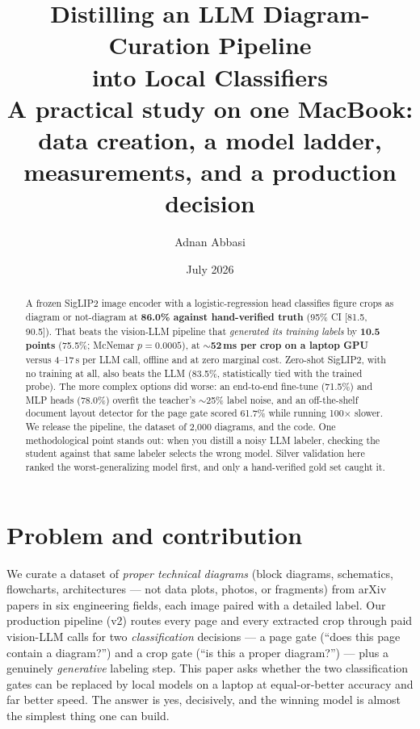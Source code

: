 \documentclass[11pt]{article}
\title{\textbf{Distilling an LLM Diagram-Curation Pipeline\\into Local Classifiers}\\[4pt]
\large A practical study on one MacBook: data creation, a model ladder,\\
measurements, and a production decision}
\author{Adnan Abbasi}
\date{July 2026}
\begin{document}
\maketitle

\begin{abstract}
\noindent
A frozen SigLIP2 image encoder with a logistic-regression head classifies
figure crops as diagram or not-diagram at \textbf{86.0\% against hand-verified
truth} (95\% CI [81.5, 90.5]). That beats the vision-LLM pipeline that
\emph{generated its training labels} by \textbf{10.5 points} (75.5\%; McNemar
$p=0.0005$), at \textbf{$\sim$52\,ms per crop on a laptop GPU} versus 4--17\,s
per LLM call, offline and at zero marginal cost. Zero-shot SigLIP2, with no
training at all, also beats the LLM (83.5\%, statistically tied with the
trained probe). The more complex options did worse: an end-to-end fine-tune
(71.5\%) and MLP heads (78.0\%) overfit the teacher's $\sim$25\% label noise,
and an off-the-shelf document layout detector for the page gate scored 61.7\%
while running 100$\times$ slower. We release the pipeline, the dataset of
2{,}000 diagrams, and the code. One methodological point stands out: when you
distill a noisy LLM labeler, checking the student against that same labeler
selects the wrong model. Silver validation here ranked the worst-generalizing
model first, and only a hand-verified gold set caught it.
\end{abstract}

\section{Problem and contribution}
We curate a dataset of \emph{proper technical diagrams} (block diagrams,
schematics, flowcharts, architectures --- not data plots, photos, or fragments)
from arXiv papers in six engineering fields, each image paired with a detailed
label. Our production pipeline (v2) routes every page and every extracted crop
through paid vision-LLM calls for two \emph{classification} decisions --- a
page gate (``does this page contain a diagram?'') and a crop gate (``is this a
proper diagram?'') --- plus a genuinely \emph{generative} labeling step. This
paper asks whether the two classification gates can be replaced by local
models on a laptop at equal-or-better accuracy and far better speed. The
answer is yes, decisively, and the winning model is almost the simplest thing
one can build.
\end{document}
